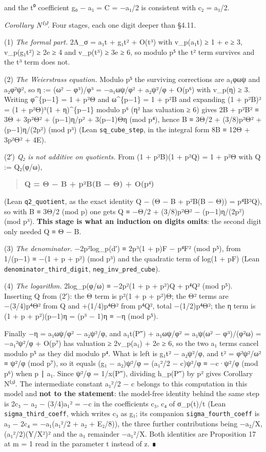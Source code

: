 \documentclass[11pt,a4paper]{article}
\theoremstyle{named}
\begin{document}
and the t⁰ coefficient g₀ − a₁ = C = −a₁/2 is consistent with c₂ = a₁/2.

\textit{Corollary N⁽³⁾.} Four stages, each one digit deeper than §4.11.

(1) \textit{The formal part.} 2Λ\_σ = a₁t + g₁t² + O(t³) with v\_p(a₁t) ≥ 1 + e ≥ 3, v\_p(g₁t²) ≥ 2e ≥ 4 and v\_p(t³) ≥ 3e ≥ 6, so modulo p⁵ the t² term survives and the t³ term does not.

(2) \textit{The Weierstrass equation.} Modulo p⁵ the surviving corrections are a₁φωψ and a₂φ²ψ², so η := (ω² − φ³)/φ³ = −a₁ωψ/φ² + a₂ψ²/φ + O(p⁶) with v\_p(η) ≥ 3. Writing φ\textasciicircum{}\{p−1\} = 1 + p²Θ and ω\textasciicircum{}\{p−1\} = 1 + p²B and expanding (1 + p²B)² = (1 + p²Θ)³(1 + η)\textasciicircum{}\{p−1\} modulo p⁶ (η² has valuation ≥ 6) gives 2B + p²B² ≡ 3Θ + 3p²Θ² + (p−1)η/p² + 3(p−1)Θη (mod p⁴), hence B ≡ 3Θ/2 + (3/8)p²Θ² + (p−1)η/(2p²) (mod p³) (Lean \texttt{sq\_\allowbreak{}cube\_\allowbreak{}step}, in the integral form 8B ≡ 12Θ + 3p²Θ² + 4E).

(2′) \textit{Q₂ is not additive on quotients.} From (1 + p²B)(1 + p²Q) = 1 + p²Θ with Q := Q₂(φ/ω),

\begin{quote}
\textbf{Q = Θ − B + p²B(B − Θ) + O(p⁴)}
\end{quote}

(Lean \texttt{q2\_\allowbreak{}quotient}, as the exact identity Q − (Θ − B + p²B(B − Θ)) = p⁴B²Q), so with B ≡ 3Θ/2 (mod p) one gets Q ≡ −Θ/2 + (3/8)p²Θ² − (p−1)η/(2p²) (mod p³). \textbf{This stage is what an induction on digits omits}: the second digit only needed Q ≡ Θ − B.

(3) \textit{The denominator.} −2p²log\_p(d′) ≡ 2p³(1 + p)F − p⁴F² (mod p⁵), from 1/(p−1) ≡ −(1 + p + p²) (mod p³) and the quadratic term of log(1 + pF) (Lean \texttt{denominator\_\allowbreak{}third\_\allowbreak{}digit}, \texttt{neg\_\allowbreak{}inv\_\allowbreak{}pred\_\allowbreak{}cube}).

(4) \textit{The logarithm.} 2log\_p(φ/ω) ≡ −2p²(1 + p + p²)Q + p⁴Q² (mod p⁵). Inserting Q from (2′): the Θ term is p²(1 + p + p²)Θ; the Θ² terms are −(3/4)p⁴Θ² from Q and +(1/4)p⁴Θ² from p⁴Q², total −(1/2)p⁴Θ²; the η term is (1 + p + p²)(p−1)η = (p³ − 1)η ≡ −η (mod p⁵).

Finally −η = a₁ωψ/φ² − a₂ψ²/φ, and a₁t(P″) + a₁ωψ/φ² = a₁ψ(ω² − φ³)/(φ²ω) = −a₁²ψ²/φ + O(p⁷) has valuation ≥ 2v\_p(a₁) + 2e ≥ 6, so the two a₁ terms cancel modulo p⁵ as they did modulo p⁴. What is left is g₁t² − a₂ψ²/φ, and t² = φ²ψ²/ω² ≡ ψ²/φ (mod p⁷), so it equals (g₁ − a₂)ψ²/φ = (a₁²/2 − c)ψ²/φ ≡ −c·ψ²/φ (mod p⁶) when p ∣ a₁. Since ψ²/φ = 1/x(P″), dividing h\_p(P″) by p² gives Corollary N⁽³⁾. The intermediate constant a₁²/2 − c belongs to this computation in this model and \textbf{not to the statement}: the model-free identity behind the same step is 2c₃ − a₂ − (3/4)a₁² = −c in the coefficients c₃, c₄ of σ\_p(t)/t (Lean \texttt{sigma\_\allowbreak{}third\_\allowbreak{}coeff}, which writes c₃ as g₁; its companion \texttt{sigma\_\allowbreak{}fourth\_\allowbreak{}coeff} is a₃ − 2c₄ = −a₁(a₁²/2 + a₂ + E₂/8)), the three further contributions being −a₂/X, (a₁²/2)(Y/X²)² and the a₁ remainder −a₁²/X. Both identities are Proposition 17 at m = 1 read in the parameter t instead of z. ∎
\end{document}
